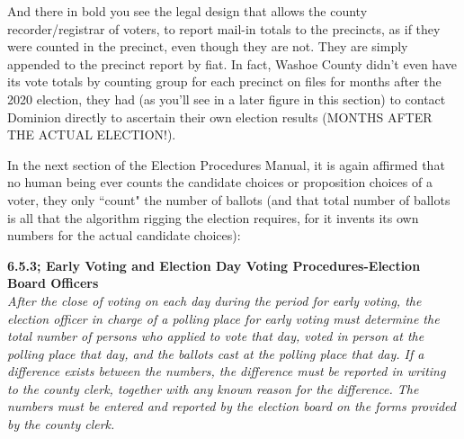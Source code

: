 And there in bold you see the legal design that allows the county recorder/registrar of voters, to report mail-in totals to the precincts, as if they were counted in the precinct, even though they are not. They are simply appended to the precinct report by fiat. In fact, Washoe County didn't even have its vote totals by counting group for each precinct on files for months after the 2020 election, they had (as you'll see in a later figure in this section) to contact Dominion directly to ascertain their own election results (MONTHS AFTER THE ACTUAL ELECTION!).

In the next section of the Election Procedures Manual, it is again affirmed that no human being ever counts the candidate choices or proposition choices of a voter, they only ``count" the number of ballots (and that total number of ballots is all that the algorithm rigging the election requires, for it invents its own numbers for the actual candidate choices):

\textbf{6.5.3; Early Voting and Election Day Voting Procedures-Election Board Officers}\\
\textit{After the close of voting on each day during the period for early voting, the election officer in charge of a
polling place for early voting must determine the total number of persons who applied to vote that day, voted
in person at the polling place that day, and the ballots cast at the polling place that day. If a difference exists
between the numbers, the difference must be reported in writing to the county clerk, together with any
known reason for the difference. The numbers must be entered and reported by the election board on the
forms provided by the county clerk.}

